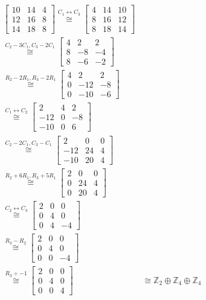\documentclass[a4paper,portuguese,11pt,twoside, leqno]{book}
\theoremstyle{definition}
\begin{document}
	\begin{align*}
	\begin{bmatrix}
	10 & 14 & 4 \\
	12 & 16 & 8 \\
	14 & 18 & 8
	\end{bmatrix} \stackrel{C_1\leftrightarrow C_3}{\cong} 
	\begin{bmatrix}
	4 & 14 & 10 \\
	8 & 16 & 12 \\
	8 & 18 & 14
	\end{bmatrix}& \\  \stackrel{C_2 - 3C_1, C_3 - 2C_1}{\cong} 
	\begin{bmatrix}
	4 & 2 & 2 \\
	8 & -8 & -4 \\
	8 & -6 & -2
	\end{bmatrix}& \\ \stackrel{R_2 - 2R_1, R_3 - 2R_1}{\cong}
	\begin{bmatrix}
	4 & 2 & 2 \\
	0 & -12 & -8 \\
	0 & -10 & -6
	\end{bmatrix}& \\ \stackrel{C_1\leftrightarrow C_2}{\cong} 
	\begin{bmatrix}
	2 & 4 & 2 \\
	-12 & 0 & -8 \\
	-10 & 0 & 6
	\end{bmatrix}& \\ \stackrel{C_2 - 2C_1, C_3 - C_1}{\cong} 
	\begin{bmatrix}
	2 & 0 & 0 \\
	-12 & 24 & 4 \\
	-10 & 20 & 4
	\end{bmatrix}& \\ \stackrel{R_2 + 6R_1, R_3 + 5R_1}{\cong} 
	\begin{bmatrix}
	2 & 0 & 0 \\
	0 & 24 & 4 \\
	0 & 20 & 4
	\end{bmatrix}& \\ \stackrel{C_2\leftrightarrow C_3}{\cong} 
	\begin{bmatrix}
	2 & 0 & 0 \\
	0 & 4 & 0 \\
	0 & 4 & -4
	\end{bmatrix}& \\ \stackrel{R_3 - R_2}{\cong} 
	\begin{bmatrix}
	2 & 0 & 0 \\
	0 & 4 & 0 \\
	0 & 0 & -4 
	\end{bmatrix}& \\ \stackrel{R_3\div-1}{\cong} 
	\begin{bmatrix}
	2 & 0 & 0 \\
	0 & 4 & 0 \\
	0 & 0 & 4
	\end{bmatrix}& \cong \mathbb{Z}_2\oplus\mathbb{Z}_4\oplus\mathbb{Z}_4
	\end{align*}
\end{document}
